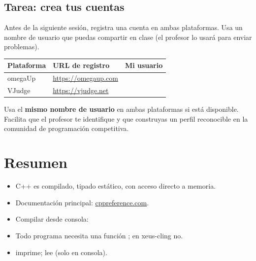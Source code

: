 \documentclass[12pt, oneside]{article}
\begin{document}
\subsection{Tarea: crea tus cuentas}

Antes de la siguiente sesión, registra una cuenta en ambas plataformas.
Usa un nombre de usuario que puedas compartir en clase (el profesor lo
usará para enviar problemas).

\begin{center}
\begin{tabular}{lll}
  \toprule
  \textbf{Plataforma} & \textbf{URL de registro} & \textbf{Mi usuario} \\
  \midrule
  omegaUp & \url{https://omegaup.com} & \hspace{3cm} \\[8pt]
  VJudge  & \url{https://vjudge.net}  & \hspace{3cm} \\
  \bottomrule
\end{tabular}
\end{center}

\begin{consejo}
  Usa el \textbf{mismo nombre de usuario} en ambas plataformas si está
  disponible. Facilita que el profesor te identifique y que construyas
  un perfil reconocible en la comunidad de programación competitiva.
\end{consejo}

\section{Resumen}

\begin{recuerda}
\begin{itemize}
  \item C++ es compilado, tipado estático, con acceso directo a memoria.
  \item Documentación principal: \href{https://en.cppreference.com}{cppreference.com}.
  \item Compilar desde consola: 
  \item Todo programa necesita una función ; en xeus-cling no.
  \item {} imprime;  lee (solo en consola).
\end{itemize}
\end{recuerda}
\end{document}
